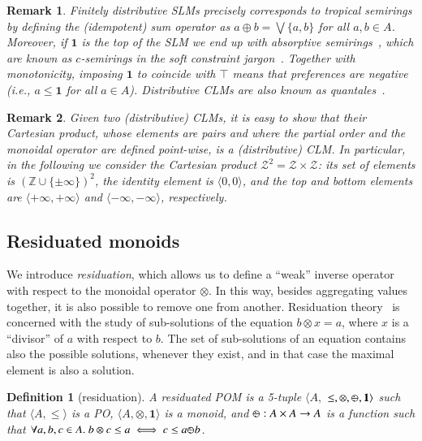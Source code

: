 \documentclass[a4paper]{elsarticle}
\newtheorem{definition}{Definition}
\newtheorem{remark}{Remark}
\newcommand{\1}{\mathbf{1}}
\def\odiv{{ \ominus\hspace{-8pt}:}\;}
\begin{document}
\begin{remark}\label{remTrop}
	Finitely distributive SLMs precisely corresponds to \emph{tropical} semirings 
	by defining the (idempotent) sum operator as
	$a \oplus b = \bigvee \{a, b\}$ for all $a,b \in A$.
	Moreover, if $\1$ is the top of the SLM we end up 
	with \emph{absorptive} semirings~\cite{golan}, 
	which are known as $c$-semirings 
	in the soft constraint jargon~\cite{jacm97}.
	Together with monotonicity, imposing $\1$ to coincide with $\top$ means 
	that preferences are negative (i.e., $a \leq \1$ for all $a \in A$).
	Distributive CLMs are also known as \emph{quantales}~\cite{quantales}.
\end{remark}

\begin{remark}
	\label{remark}
	Given two (distributive) CLMs, it is easy to show that their Cartesian product, whose elements are pairs and where the partial order and the monoidal operator are 
	defined point-wise, is a (distributive) CLM.
	In particular, in the following we consider the Cartesian product $\mathcal{Z}^2 = \mathcal{Z} \times \mathcal{Z}$:
	its set of
	elements is $(\mathbb{Z} \cup \{\pm \infty\})^2$, the identity element is $\langle 0,0 \rangle$,
	and the top and bottom elements are $\langle +\infty, +\infty \rangle$ and $\langle -\infty, -\infty \rangle$, respectively.
\end{remark}

\subsection{Residuated monoids}

We introduce \emph{residuation}, which allows us to define a ``weak'' inverse 
operator with respect to the monoidal operator $\otimes$. 
In this way, besides aggregating values together, it is also possible to remove one from 
another. Residuation theory~\cite{golan} is concerned with the study of sub-solutions of the 
equation $b \otimes x = a$, where $x$ is a ``divisor'' of $a$ with respect to $b$. 
The set of sub-solutions of an equation contains also the 
possible solutions, whenever they exist, and in that case the maximal element is also a 
solution.

\begin{definition}[residuation]
	A residuated POM is a 5-tuple $\langle A,$ $\leq, \otimes,  \odiv, \1 \rangle$ such that
	$\langle A, \leq \rangle$ is a PO,  $\langle A, \otimes, \1 \rangle$ is a monoid, and
	$\odiv: A \times A \rightarrow A$ is a function such that $\forall a, b, c \in A.\ b \otimes c \leq a \iff c \leq a \odiv b$.
\end{definition}
\end{document}
